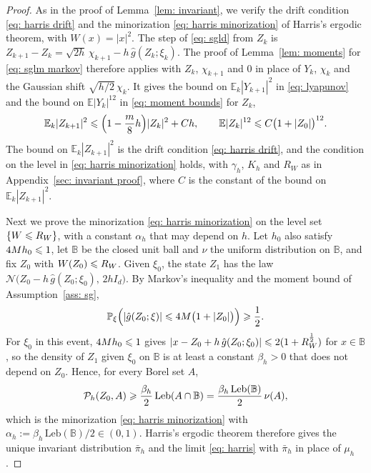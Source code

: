 \begin{proof}
    As in the proof of Lemma~\ref{lem: invariant}, we verify the drift condition \eqref{eq: harris drift} and the minorization \eqref{eq: harris minorization} of Harris's ergodic theorem, with $W(x) = |x|^2$. The step of \eqref{eq: sgld} from $Z_k$ is $Z_{k+1} - Z_k = \sqrt{2h}\, \chi_{k+1} - h\, \hat g(Z_k;\xi_k)$. The proof of Lemma~\ref{lem: moments} for \eqref{eq: sglm markov} therefore applies with $Z_k$, $\chi_{k+1}$ and $0$ in place of $Y_k$, $\chi_k$ and the Gaussian shift $\sqrt{h/2}\, \chi_k$. It gives the bound on $\mathbb E_k |Y_{k+1}|^2$ in \eqref{eq: lyapunov} and the bound on $\mathbb E |Y_k|^{12}$ in \eqref{eq: moment bounds} for $Z_k$,
    \begin{equation*}
        \mathbb E_k |Z_{k+1}|^{2} \leqslant \Bigl( 1 - \frac{m}{8} h \Bigr) |Z_k|^{2} + C h , \qquad \mathbb E |Z_k|^{12} \leqslant C \bigl( 1 + |Z_0| \bigr)^{12} .
    \end{equation*}
    The bound on $\mathbb E_k |Z_{k+1}|^2$ is the drift condition \eqref{eq: harris drift}, and the condition on the level in \eqref{eq: harris minorization} holds, with $\gamma_h$, $K_h$ and $R_W$ as in Appendix~\ref{sec: invariant proof}, where $C$ is the constant of the bound on $\mathbb E_k |Z_{k+1}|^2$.

    Next we prove the minorization \eqref{eq: harris minorization} on the level set $\{W \leqslant R_W\}$, with a constant $\alpha_h$ that may depend on $h$. Let $h_0$ also satisfy $4 M h_0 \leqslant 1$, let $\mathbb B$ be the closed unit ball and $\nu$ the uniform distribution on $\mathbb B$, and fix $Z_0$ with $W(Z_0) \leqslant R_W$. Given $\xi_0$, the state $Z_1$ has the law $\mathcal N\bigl( Z_0 - h\, \hat g(Z_0;\xi_0) ,\, 2h I_d \bigr)$. By Markov's inequality and the moment bound of Assumption~\ref{ass: sg},
    \begin{equation*}
        \mathbb P_\xi\Bigl( |\hat g(Z_0;\xi)| \leqslant 4M \bigl( 1 + |Z_0| \bigr) \Bigr) \geqslant \frac12 .
    \end{equation*}
    For $\xi_0$ in this event, $4 M h_0 \leqslant 1$ gives $| x - Z_0 + h\, \hat g(Z_0;\xi_0) | \leqslant 2 ( 1 + R_W^{\frac12} )$ for $x \in \mathbb B$, so the density of $Z_1$ given $\xi_0$ on $\mathbb B$ is at least a constant $\beta_h > 0$ that does not depend on $Z_0$. Hence, for every Borel set $A$,
    \begin{equation*}
        \mathcal P_h(Z_0, A) \geqslant \frac{\beta_h}{2}\, \mathrm{Leb}(A \cap \mathbb B) = \frac{\beta_h\, \mathrm{Leb}(\mathbb B)}{2}\, \nu(A) ,
    \end{equation*}
    which is the minorization \eqref{eq: harris minorization} with $\alpha_h := \beta_h\, \mathrm{Leb}(\mathbb B) / 2 \in (0,1)$. Harris's ergodic theorem therefore gives the unique invariant distribution $\bar\pi_h$ and the limit \eqref{eq: harris} with $\bar\pi_h$ in place of $\mu_h$.


\end{proof}
